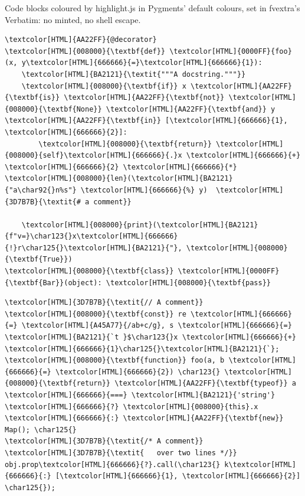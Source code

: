 Code blocks coloured by highlight.js in Pygments' default colours, set in
fvextra's Verbatim: no minted, no shell escape.

\begin{Verbatim}[commandchars=\\\{\}]
\textcolor[HTML]{AA22FF}{@decorator}
\textcolor[HTML]{008000}{\textbf{def}} \textcolor[HTML]{0000FF}{foo}(x, y\textcolor[HTML]{666666}{=}\textcolor[HTML]{666666}{1}):
    \textcolor[HTML]{BA2121}{\textit{"""A docstring."""}}
    \textcolor[HTML]{008000}{\textbf{if}} x \textcolor[HTML]{AA22FF}{\textbf{is}} \textcolor[HTML]{AA22FF}{\textbf{not}} \textcolor[HTML]{008000}{\textbf{None}} \textcolor[HTML]{AA22FF}{\textbf{and}} y \textcolor[HTML]{AA22FF}{\textbf{in}} [\textcolor[HTML]{666666}{1}, \textcolor[HTML]{666666}{2}]:
        \textcolor[HTML]{008000}{\textbf{return}} \textcolor[HTML]{008000}{self}\textcolor[HTML]{666666}{.}x \textcolor[HTML]{666666}{+} \textcolor[HTML]{666666}{2} \textcolor[HTML]{666666}{*} \textcolor[HTML]{008000}{len}(\textcolor[HTML]{BA2121}{"a\char92{}n%s"} \textcolor[HTML]{666666}{%} y)  \textcolor[HTML]{3D7B7B}{\textit{# a comment}}

	\textcolor[HTML]{008000}{print}(\textcolor[HTML]{BA2121}{f"v=}\char123{}x\textcolor[HTML]{666666}{!}r\char125{}\textcolor[HTML]{BA2121}{"}, \textcolor[HTML]{008000}{\textbf{True}})
\textcolor[HTML]{008000}{\textbf{class}} \textcolor[HTML]{0000FF}{\textbf{Bar}}(object): \textcolor[HTML]{008000}{\textbf{pass}}
\end{Verbatim}

\begin{Verbatim}[commandchars=\\\{\}]
\textcolor[HTML]{3D7B7B}{\textit{// A comment}}
\textcolor[HTML]{008000}{\textbf{const}} re \textcolor[HTML]{666666}{=} \textcolor[HTML]{A45A77}{/ab+c/g}, s \textcolor[HTML]{666666}{=} \textcolor[HTML]{BA2121}{`t }$\char123{}x \textcolor[HTML]{666666}{+} \textcolor[HTML]{666666}{1}\char125{}\textcolor[HTML]{BA2121}{`};
\textcolor[HTML]{008000}{\textbf{function}} foo(a, b \textcolor[HTML]{666666}{=} \textcolor[HTML]{666666}{2}) \char123{} \textcolor[HTML]{008000}{\textbf{return}} \textcolor[HTML]{AA22FF}{\textbf{typeof}} a \textcolor[HTML]{666666}{===} \textcolor[HTML]{BA2121}{'string'} \textcolor[HTML]{666666}{?} \textcolor[HTML]{008000}{this}.x \textcolor[HTML]{666666}{:} \textcolor[HTML]{AA22FF}{\textbf{new}} Map(); \char125{}
\textcolor[HTML]{3D7B7B}{\textit{/* A comment}}
\textcolor[HTML]{3D7B7B}{\textit{   over two lines */}} obj.prop\textcolor[HTML]{666666}{?}.call(\char123{} k\textcolor[HTML]{666666}{:} [\textcolor[HTML]{666666}{1}, \textcolor[HTML]{666666}{2}] \char125{});
\end{Verbatim}

